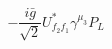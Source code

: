 %
\begin{dmath*}
%
  -  \frac{i {\bar g}{}}{\sqrt{2}}U_{f_2 f_1}^* \gamma^{\mu_3} P_L
%
\end{dmath*}
%

